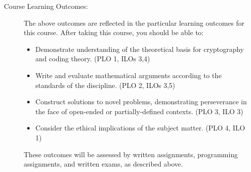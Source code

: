 \documentclass[
  twoside]{article}
\begin{document}
\begin{description}
\item[Course Learning Outcomes:] The above outcomes are reflected in the
     particular learning outcomes for this course.
     After taking this course, you should be able
     to:
    \begin{itemize}
        \item Demonstrate understanding of the theoretical basis for cryptography and coding theory.
             (PLO 1, ILOs 3,4)
        \item Write and evaluate mathematical arguments according to the
             standards of the discipline. (PLO 2,
              ILOs 3,5)
        \item Construct solutions to novel problems,
               demonstrating perseverance in the face of open-ended or
               partially-defined contexts. (PLO 3, ILO 3)
        \item Consider the ethical implications of the subject matter. (PLO 4, ILO 1)
    \end{itemize}
These outcomes will be assessed by written assignments, programming assignments, and written exams, as described above.

\end{description}
\end{document}
